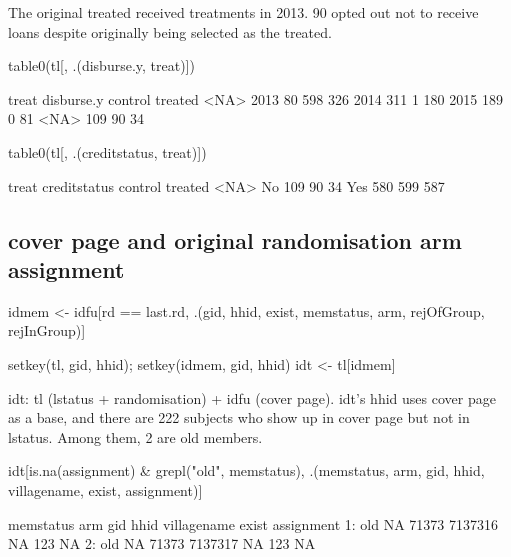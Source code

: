 	The original treated received treatments in 2013. 90 opted out not to receive loans despite originally being selected as the treated.
\begin{Schunk}
\begin{Sinput}
table0(tl[, .(disburse.y, treat)])
\end{Sinput}
\begin{Soutput}
          treat
disburse.y control treated <NA>
      2013      80     598  326
      2014     311       1  180
      2015     189       0   81
      <NA>     109      90   34
\end{Soutput}
\begin{Sinput}
table0(tl[, .(creditstatus, treat)])
\end{Sinput}
\begin{Soutput}
            treat
creditstatus control treated <NA>
         No      109      90   34
         Yes     580     599  587
\end{Soutput}
\end{Schunk}


\subsection{cover page and original randomisation arm assignment}


\begin{Schunk}
\begin{Sinput}
idmem <- idfu[rd == last.rd, .(gid, hhid, exist, memstatus, arm, rejOfGroup, rejInGroup)]
\end{Sinput}
\end{Schunk}
\begin{Schunk}
\begin{Sinput}
setkey(tl, gid, hhid); setkey(idmem, gid, hhid)
idt <- tl[idmem]
\end{Sinput}
\end{Schunk}
\textsf{idt: tl (lstatus + randomisation) + idfu (cover page)}. \textsf{idt}'s hhid uses cover page as a base, and there are 222 subjects who show up in cover page but not in lstatus. Among them, 2 are old members.
\begin{Schunk}
\begin{Sinput}
idt[is.na(assignment) & grepl("old", memstatus), 
	.(memstatus, arm, gid, hhid, villagename, exist, assignment)]
\end{Sinput}
\begin{Soutput}
   memstatus arm   gid    hhid villagename exist assignment
1:       old  NA 71373 7137316          NA   123         NA
2:       old  NA 71373 7137317          NA   123         NA
\end{Soutput}
\end{Schunk}

